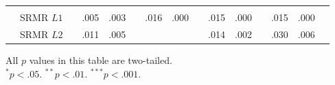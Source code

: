{\begin{tabular}{l @{\hskip -7.9cm} l c rr @{\hskip -0.1mm}l rr @{\hskip -0.1mm}l rr @{\hskip -0.1mm}l rr @{\hskip -0.1mm}l}
    &&&&&&&&&&&&&&\\
    & SRMR $L1$ &       & .005 & .003 &       & .016 & .000 &       & .015 & .000 &       & .015 & .000 &  \\
    & SRMR $L2$ &       & .011 & .005 &       &       &       &       & .014 & .002 &       & .030 & .006 &  \\
\bottomrule
    \end{tabular}
}{All $p$ values in this table are two-tailed.\\
$^* p < .05$. $^{**} p < .01$. $^{***} p < .001$.}
